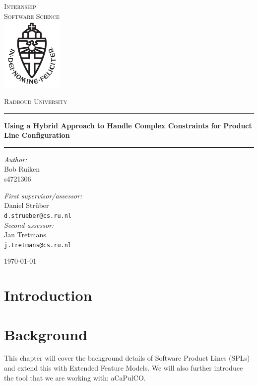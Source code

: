 \documentclass[11pt,a4paper]{report}
\theoremstyle{definition}
\begin{document}
\begin{titlepage}
\begin{center}
\textsc{\LARGE Internship\\Software Science}\\[1.5cm]
\includegraphics[height=100pt]{logo}

\vspace{0.4cm}
\textsc{\Large Radboud University}\\[1cm]
\hrule
\vspace{0.4cm}
\textbf{\Large Using a Hybrid Approach to Handle Complex Constraints for Product Line Configuration}\\[0.4cm]
\hrule
\vspace{2cm}
\begin{minipage}[t]{0.45\textwidth}
\begin{flushleft} \large
\textit{Author:}\\
Bob Ruiken\\
s4721306
\end{flushleft}
\end{minipage}
\begin{minipage}[t]{0.48\textwidth}
\begin{flushright} \large
\textit{First supervisor/assessor:}\\
Daniel Str{\"u}ber\\
\texttt{d.strueber@cs.ru.nl}\\[1.3cm]
\textit{Second assessor:}\\
Jan Tretmans\\
\texttt{j.tretmans@cs.ru.nl}
\end{flushright}
\end{minipage}
\vfill
{\large \today}
\end{center}
\end{titlepage}

\setcounter{tocdepth}{1}
\tableofcontents
\newpage

\setlength{\parskip}{10pt}

\chapter{Introduction}\label{ch:introduction}

\chapter{Background}\label{ch:background}
This chapter will cover the background details of Software Product Lines
(SPLs) and extend this with Extended Feature Models. We will also 
further introduce the tool that we are working with: aCaPulCO.








\end{document}
